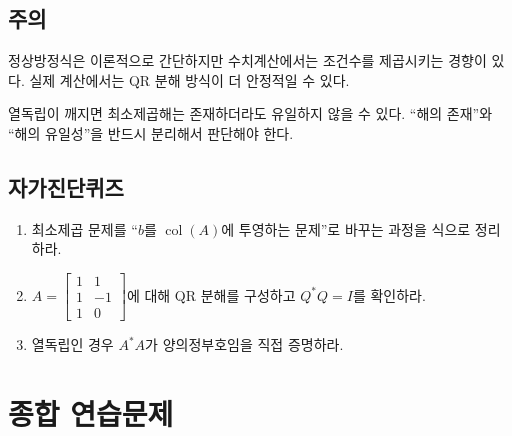 \subsection*{주의}
\begin{warning}
정상방정식은 이론적으로 간단하지만 수치계산에서는 조건수를 제곱시키는 경향이 있다. 실제 계산에서는 QR 분해 방식이 더 안정적일 수 있다.
\end{warning}
\begin{warning}
열독립이 깨지면 최소제곱해는 존재하더라도 유일하지 않을 수 있다. ``해의 존재''와 ``해의 유일성''을 반드시 분리해서 판단해야 한다.
\end{warning}

\subsection*{자가진단퀴즈}
\begin{enumerate}[label=\arabic*.]
\item 최소제곱 문제를 ``$b$를 $\operatorname{col}(A)$에 투영하는 문제''로 바꾸는 과정을 식으로 정리하라.
\item $A=\begin{bmatrix}1&1\\1&-1\\1&0\end{bmatrix}$에 대해 QR 분해를 구성하고 $Q^*Q=I$를 확인하라.
\item 열독립인 경우 $A^*A$가 양의정부호임을 직접 증명하라.
\end{enumerate}


\chaptersummarytemplate

\section*{종합 연습문제}


